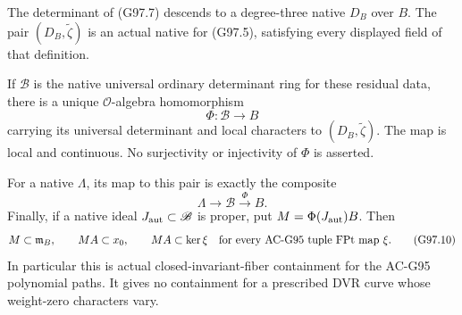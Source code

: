 \begin{theorem}
\label{AC-G97-pair}
The determinant of (G97.7) descends to a degree-three
native  \(D_B\) over \(B\).  The pair
\((D_B,\widetilde\zeta)\) is an actual native
 for (G97.5), satisfying every displayed field
of that definition.

If \(\mathscr B\) is the native universal ordinary
determinant ring for these residual data, there is a unique
\(\mathcal O\)-algebra homomorphism
\[
                  \Phi:\mathscr B\longrightarrow B
 \tag{G97.8}
\]
carrying its universal determinant and local characters
to \((D_B,\widetilde\zeta)\).  The map is local and
continuous.  No surjectivity or injectivity of \(\Phi\)
is asserted.

For a native  \(\Lambda\), its map to this
pair is exactly the composite
\[
        \Lambda\longrightarrow\mathscr B
                   \xrightarrow{\Phi}B .
 \tag{G97.9}
\]
Finally, if a native ideal \(J_{\rm aut}\subset\mathscr B\)
is proper, put \(M=\Phi(J_{\rm aut})B\).  Then
\[
 M\subset\mathfrak m_B,\qquad
 MA\subset x_0,\qquad
 MA\subset\ker\xi
 \quad\hbox{for every AC-G95 tuple \(\mathrm{FPt}\) map }\xi.
 \tag{G97.10}
\]
In particular this is actual closed-invariant-fiber
containment for the AC-G95 polynomial paths.  It gives
no containment for a prescribed DVR curve whose
weight-zero characters vary.
\end{theorem}

